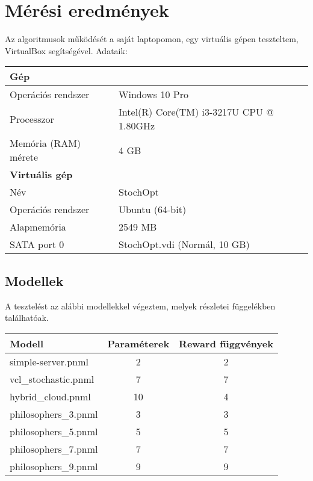 \chapter{Mérési eredmények}
\label{sec:meresek}
Az algoritmusok működését a saját laptopomon, egy virtuális gépen teszteltem, VirtualBox segítségével. Adataik:\\
\begin{center}
	\begin{tabular}{ll}
		\hline
		\textbf{Gép} & \\
		\hline
		Operációs rendszer & Windows 10 Pro\\
		Processzor & Intel(R) Core(TM) i3-3217U CPU @ 1.80GHz\\
		Memória (RAM) mérete & 4 GB\\
		\hline
		\textbf{Virtuális gép} & \\
		\hline
		Név & StochOpt\\
		Operációs rendszer & Ubuntu (64-bit)\\
		Alapmemória & 2549 MB\\
		SATA port 0 & StochOpt.vdi (Normál, 10 GB)
	\end{tabular}
\end{center}

\section{Modellek}
A tesztelést az alábbi modellekkel végeztem, melyek részletei  függelékben találhatóak.\\
\begin{center}
	\begin{tabular}{lcc}
		\textbf{Modell} & \textbf{Paraméterek} & \textbf{Reward függvények} \\
		\hline
		simple-server.pnml & 2 & 2 \\
		vcl\_stochastic.pnml & 7 & 7 \\
		hybrid\_cloud.pnml & 10 & 4\\
		philosophers\_3.pnml & 3 & 3\\
		philosophers\_5.pnml & 5 & 5\\
		philosophers\_7.pnml & 7 & 7\\
		philosophers\_9.pnml & 9 & 9\\
	\end{tabular}	
\end{center}


